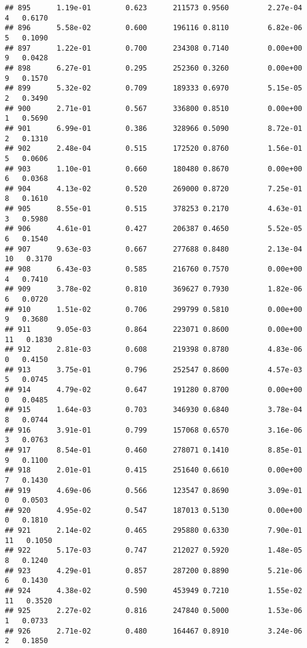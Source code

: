 \documentclass[
]{article}
\begin{document}
\begin{verbatim}
## 895      1.19e-01        0.623      211573 0.9560         2.27e-04   4   0.6170
## 896      5.58e-02        0.600      196116 0.8110         6.82e-06   5   0.1090
## 897      1.22e-01        0.700      234308 0.7140         0.00e+00   9   0.0428
## 898      6.27e-01        0.295      252360 0.3260         0.00e+00   9   0.1570
## 899      5.32e-02        0.709      189333 0.6970         5.15e-05   2   0.3490
## 900      2.71e-01        0.567      336800 0.8510         0.00e+00   1   0.5690
## 901      6.99e-01        0.386      328966 0.5090         8.72e-01   2   0.1310
## 902      2.48e-04        0.515      172520 0.8760         1.56e-01   5   0.0606
## 903      1.10e-01        0.660      180480 0.8670         0.00e+00   6   0.0368
## 904      4.13e-02        0.520      269000 0.8720         7.25e-01   8   0.1610
## 905      8.55e-01        0.515      378253 0.2170         4.63e-01   3   0.5980
## 906      4.61e-01        0.427      206387 0.4650         5.52e-05   6   0.1540
## 907      9.63e-03        0.667      277688 0.8480         2.13e-04  10   0.3170
## 908      6.43e-03        0.585      216760 0.7570         0.00e+00   4   0.7410
## 909      3.78e-02        0.810      369627 0.7930         1.82e-06   6   0.0720
## 910      1.51e-02        0.706      299799 0.5810         0.00e+00   9   0.3680
## 911      9.05e-03        0.864      223071 0.8600         0.00e+00  11   0.1830
## 912      2.81e-03        0.608      219398 0.8780         4.83e-06   0   0.4150
## 913      3.75e-01        0.796      252547 0.8600         4.57e-03   5   0.0745
## 914      4.79e-02        0.647      191280 0.8700         0.00e+00   0   0.0485
## 915      1.64e-03        0.703      346930 0.6840         3.78e-04   8   0.0744
## 916      3.91e-01        0.799      157068 0.6570         3.16e-06   3   0.0763
## 917      8.54e-01        0.460      278071 0.1410         8.85e-01   9   0.1100
## 918      2.01e-01        0.415      251640 0.6610         0.00e+00   7   0.1430
## 919      4.69e-06        0.566      123547 0.8690         3.09e-01   0   0.0503
## 920      4.95e-02        0.547      187013 0.5130         0.00e+00   0   0.1810
## 921      2.14e-02        0.465      295880 0.6330         7.90e-01  11   0.1050
## 922      5.17e-03        0.747      212027 0.5920         1.48e-05   8   0.1240
## 923      4.29e-01        0.857      287200 0.8890         5.21e-06   6   0.1430
## 924      4.38e-02        0.590      453949 0.7210         1.55e-02  11   0.3520
## 925      2.27e-02        0.816      247840 0.5000         1.53e-06   1   0.0733
## 926      2.71e-02        0.480      164467 0.8910         3.24e-06   2   0.1850

\end{verbatim}
\end{document}
